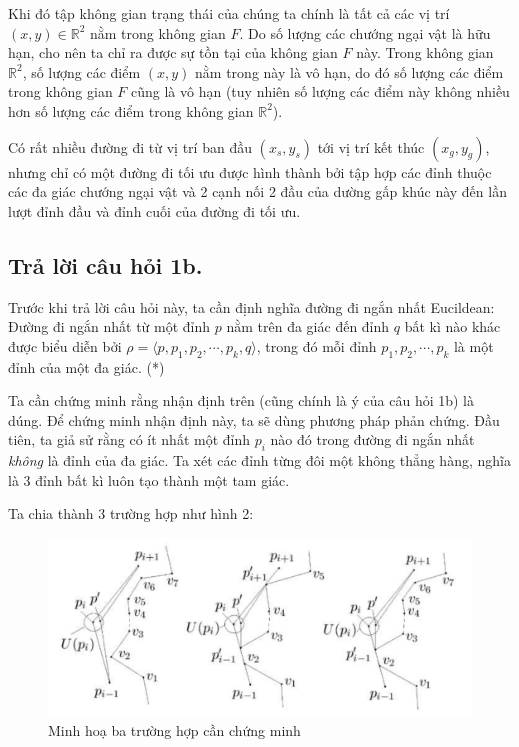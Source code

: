 \documentclass[a4paper, 11pt]{article}
\begin{document}
Khi đó tập không gian trạng thái của chúng ta chính là tất cả các vị trí $(x, y) \in {\mathbb{R}}^2$ nằm trong không gian $F$. Do số lượng các chướng ngại vật là hữu hạn, cho nên ta chỉ ra được sự tồn tại của không gian $F$ này. Trong không gian ${\mathbb{R}}^2$, số lượng các điểm $(x, y)$ nằm trong này là vô hạn, do đó số lượng các điểm trong không gian $F$ cũng là vô hạn (tuy nhiên số lượng các điểm này không nhiều hơn số lượng các điểm trong không gian ${\mathbb{R}}^2$). 

Có rất nhiều đường đi từ vị trí ban đầu $(x_s, y_s)$ tới vị trí kết thúc $(x_g, y_g)$, nhưng chỉ có một đường đi tối ưu được hình thành bởi tập hợp các đỉnh thuộc các đa giác chướng ngại vật và 2 cạnh nối 2 đầu của dường gấp khúc này đến lần lượt đỉnh đầu và đỉnh cuối của đường đi tối ưu.

\subsection{Trả lời câu hỏi 1b.}
Trước khi trả lời câu hỏi này, ta cần định nghĩa đường đi ngắn nhất Eucildean: Đường đi ngắn nhất từ một đỉnh $p$ nằm trên đa giác đến đỉnh $q$ bất kì nào khác được biểu diễn bởi $\rho = \langle p, p_1, p_2, \cdots, p_k, q \rangle$, trong đó mỗi đỉnh $p_1, p_2, \cdots, p_k$ là một đỉnh của một đa giác. (*)

Ta cần chứng minh rằng nhận định trên (cũng chính là ý của câu hỏi 1b) là dúng. Để chứng minh nhận định này, ta sẽ dùng phương pháp phản chứng. Đầu tiên, ta giả sử rằng có ít nhất một đỉnh $p_i$ nào đó trong đường đi ngắn nhất \textit{không} là đỉnh của đa giác. Ta xét các đỉnh từng đôi một không thẳng hàng, nghĩa là 3 đỉnh bất kì luôn tạo thành một tam giác.

Ta chia thành 3 trường hợp như hình 2:

\begin{figure}[h]
  \centering
  \includegraphics[width=\textwidth,height=\textheight,keepaspectratio]{proof.png}
  \caption{Minh hoạ ba trường hợp cần chứng minh}
\end{figure}
\end{document}
